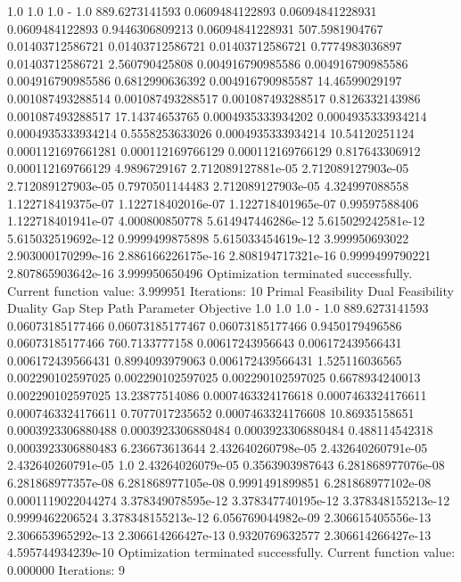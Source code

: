 \documentclass[letterpaper,10pt,english]{sphinxmanual}
\begin{document}
{\begin{sphinxVerbatim}[commandchars=\\\{\}]
1.0                 1.0                 1.0                 -                1.0                 889.6273141593
0.0609484122893     0.06094841228931    0.0609484122893     0.9446306809213  0.06094841228931    507.5981904767
0.01403712586721    0.01403712586721    0.01403712586721    0.7774983036897  0.01403712586721    2.560790425808
0.004916790985586   0.004916790985586   0.004916790985586   0.6812990636392  0.004916790985587   14.46599029197
0.001087493288514   0.001087493288517   0.001087493288517   0.8126332143986  0.001087493288517   17.14374653765
0.0004935333934202  0.0004935333934214  0.0004935333934214  0.5558253633026  0.0004935333934214  10.54120251124
0.0001121697661281  0.000112169766129   0.000112169766129   0.817643306912   0.000112169766129   4.9896729167
2.712089127881e-05  2.712089127903e-05  2.712089127903e-05  0.7970501144483  2.712089127903e-05  4.324997088558
1.122718419375e-07  1.122718402016e-07  1.122718401965e-07  0.99597588406    1.122718401941e-07  4.000800850778
5.614947446286e-12  5.615029242581e-12  5.615032519692e-12  0.9999499875898  5.615033454619e-12  3.999950693022
2.903000170299e-16  2.886166226175e-16  2.808194717321e-16  0.9999499790221  2.807865903642e-16  3.999950650496
Optimization terminated successfully.
         Current function value: 3.999951
         Iterations: 10
Primal Feasibility  Dual Feasibility    Duality Gap         Step             Path Parameter      Objective
1.0                 1.0                 1.0                 -                1.0                 889.6273141593
0.06073185177466    0.06073185177467    0.06073185177466    0.9450179496586  0.06073185177466    760.7133777158
0.00617243956643    0.006172439566431   0.006172439566431   0.8994093979063  0.006172439566431   1.525116036565
0.002290102597025   0.002290102597025   0.002290102597025   0.6678934240013  0.002290102597025   13.23877514086
0.0007463324176618  0.0007463324176611  0.0007463324176611  0.7077017235652  0.0007463324176608  10.86935158651
0.0003923306880488  0.0003923306880484  0.0003923306880484  0.488114542318   0.0003923306880483  6.236673613644
2.432640260798e-05  2.432640260791e-05  2.432640260791e-05  1.0              2.43264026079e-05   0.3563903987643
6.281868977076e-08  6.281868977357e-08  6.281868977105e-08  0.9991491899851  6.281868977102e-08  0.0001119022044274
3.378349078595e-12  3.378347740195e-12  3.378348155213e-12  0.9999462206524  3.378348155213e-12  6.056769044982e-09
2.306615405556e-13  2.306653965292e-13  2.306614266427e-13  0.9320769632577  2.306614266427e-13  4.595744934239e-10
Optimization terminated successfully.
         Current function value: 0.000000
         Iterations: 9
\end{sphinxVerbatim}
}
\end{document}

